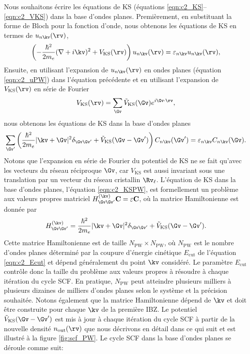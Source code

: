 Nous souhaitons écrire les équations de KS (équations \eqref{eqn:c2_KS}--\eqref{eqn:c2_VKS}) dans la base d'ondes planes. Premièrement, en substituant la forme de Bloch pour la fonction d'onde, nous obtenons les équations de KS en termes de $u_{n\kv}(\rv)$,
\begin{equation}
    \left(-\frac{\hbar^2}{2m_e}(\nabla+i\kv)^2+V_\text{KS}(\rv)\right)u_{n\kv}(\rv)=\varepsilon_{n\kv}u_{n\kv}(\rv),
    \label{eqn:c2_UKS}
\end{equation}
Ensuite, en utilisant l'expansion de $u_{n\kv}(\rv)$ en ondes planes (équation \eqref{eqn:c2_uPW}) dans l'équation précédente et en utilisant l'expansion de $V_\text{KS}(\rv)$ en série de Fourier 
\begin{equation}
    V_\text{KS}(\rv)=\sum_{\Gv}\tilde{V}_\text{KS}(\Gv)e^{i\Gv\cdot\rv},
    \label{eqn:c2_VKSG}
\end{equation}
nous obtenons les équations de KS dans la base d'ondes planes
\begin{equation}
    \sum_{\Gv'}\left(\frac{\hbar^2}{2m_e}|\kv+\Gv|^2\delta_{\Gv\Gv'}+\tilde{V}_\text{KS}(\Gv-\Gv')\right)C_{n\kv}(\Gv')=\varepsilon_{n\kv}C_{n\kv}(\Gv).
    \label{eqn:c2_KSPW}
\end{equation}
Notons que l'expansion en série de Fourier du potentiel de KS ne se fait qu'avec les vecteurs du réseau réciproque $\Gv$, car $V_\text{KS}$ est aussi invariant sous une translation par un vecteur du réseau cristallin $\Rv_\ell$. L'équation de KS dans la base d'ondes planes, l'équation \eqref{eqn:c2_KSPW}, est formellement un problème aux valeurs propres matriciel $H^{(\kv)}_{\Gv\Gv'}\mathbf{C}=\varepsilon\mathbf{C}$, où la matrice Hamiltonienne est donnée par
\begin{equation}
    H^{(\kv)}_{\Gv\Gv'}=\frac{\hbar^2}{2m_e}|\kv+\Gv|^2\delta_{\Gv\Gv'}+\tilde{V}_\text{KS}(\Gv-\Gv').
    \label{eqn:c2_HGG}
\end{equation}
Cette matrice Hamiltonienne est de taille $N_\text{PW}\times N_\text{PW}$, où $N_\text{PW}$ est le nombre d'ondes planes déterminé par la coupure d'énergie cinétique $E_\text{cut}$ de l'équation \eqref{eqn:c2_Ecut} et dépend généralement du point $\kv$ considéré. Le paramètre $E_\text{cut}$ contrôle donc la taille du problème aux valeurs propres à résoudre à chaque itération du cycle SCF. En pratique, $N_\text{PW}$ peut atteindre plusieurs milliers à plusieurs dizaines de milliers d'ondes planes selon le système et la précision souhaitée. Notons également que la matrice Hamiltonienne dépend de $\kv$ et doit être construite pour chaque $\kv$ de la première IBZ. Le potentiel $\tilde{V}_\text{KS}(\Gv-\Gv')$ est mis à jour à chaque itération du cycle SCF à partir de la nouvelle densité $n_\text{out}(\rv)$ que nous décrivons en détail dans ce qui suit et est illustré à la figure \ref{fig:scf_PW}. Le cycle SCF dans la base d'ondes planes se déroule comme suit:
